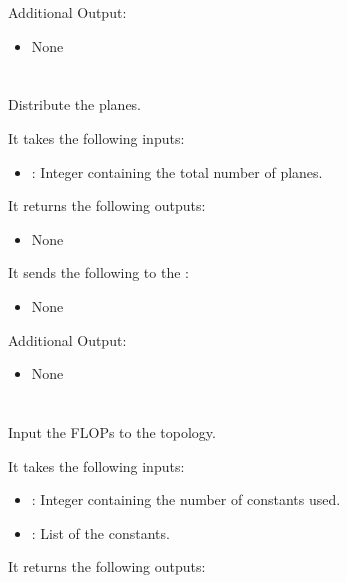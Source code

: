 Additional Output:
\begin{itemize}
\item None
\end{itemize}


\section{}
Distribute the planes.

It takes the following inputs:

\begin{itemize}
\item {}:  Integer containing the total number of planes.
\end{itemize}

It returns the following outputs:

\begin{itemize}
\item None
\end{itemize}

It sends the following to the :

\begin{itemize}
\item None
\end{itemize}

Additional Output:
\begin{itemize}
\item None
\end{itemize}


\section{}
Input the FLOPs to the topology.

It takes the following inputs:

\begin{itemize}
\item {}:  Integer containing the number of constants used.
\item {}: List of the constants.
\end{itemize}

It returns the following outputs:

